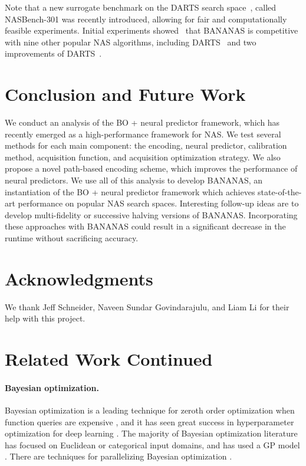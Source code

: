 \documentclass[11pt]{article}
\numberwithin{equation}{section}
\numberwithin{figure}{section}
\theoremstyle{plain}
\theoremstyle{definition}
\begin{document}
Note that a new surrogate benchmark on the DARTS search space~\cite{nasbench301}, 
called NASBench-301 was recently introduced, 
allowing for fair and computationally feasible experiments.
Initial experiments showed~\cite{nasbench301}
that BANANAS is competitive with nine other popular NAS algorithms, 
including DARTS~\cite{darts} and two improvements of DARTS~\cite{pcdarts, gdas}.
 
\section{Conclusion and Future Work}
\label{sec:conclusion}

We conduct an analysis of the BO + neural predictor framework,
which has recently emerged as a high-performance framework for NAS.
We test several methods for each main component: the encoding, neural predictor,
calibration method, acquisition function, and acquisition
optimization strategy.
We also propose a novel path-based encoding scheme, which improves the performance
of neural predictors.
We use all of this analysis to develop BANANAS, an instantiation
of the BO + neural predictor framework which achieves state-of-the-art performance
on popular NAS search spaces.
Interesting follow-up ideas are to develop multi-fidelity or
successive halving versions of BANANAS. 
Incorporating these approaches with BANANAS could result in a 
significant decrease in the runtime without sacrificing accuracy.
 
\section*{Acknowledgments}
We thank Jeff Schneider, Naveen Sundar Govindarajulu, and Liam Li for their help with this project.

\newpage



\newpage

\appendix

\section{Related Work Continued}
\label{app:relatedwork}

\paragraph{Bayesian optimization.}
Bayesian optimization is a leading technique for zeroth order optimization
when function queries are expensive \cite{gpml, frazier2018tutorial},
and it has seen great success in hyperparameter optimization for deep
learning \cite{gpml, vizier, hyperband}. The majority of Bayesian optimization
literature has focused on Euclidean or categorical input domains, and has used a
GP model \cite{gpml, vizier, frazier2018tutorial, snoek2012practical}.
There are techniques for parallelizing Bayesian optimization 
\cite{gonzalez2016batch, kandasamy2018parallelised, ovcenavsek2000parallel}.
\end{document}
